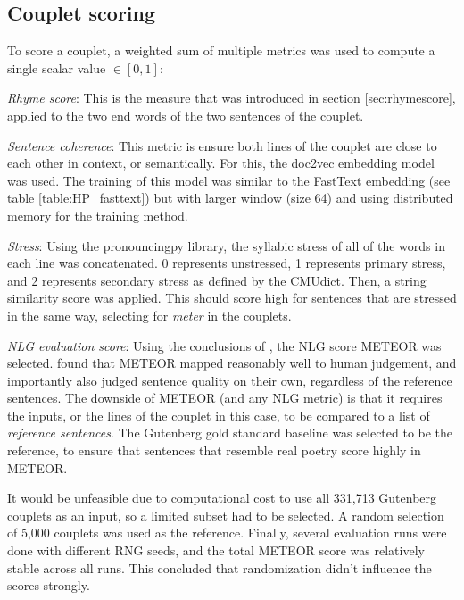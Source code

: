 \documentclass[11pt,a4paper]{article}
\newenvironment{tight_itemize}{
\begin{itemize}
\setlength{\itemsep}{0pt}
\setlength{\parskip}{0pt}
}{\end{itemize}}
\begin{document}
\subsection{Couplet scoring}
\label{sec:coupletscore}
To score a couplet, a weighted sum of multiple metrics was used to compute a single scalar value $\in [0, 1]$:
\begin{tight_itemize}
	\vspace{-0.5em}
	\item \textit{Rhyme score}: This is the measure that was introduced in section \ref{sec:rhymescore}, applied to the two end words of the two sentences of the couplet.
	\item \textit{Sentence coherence}: This metric is ensure both lines of the couplet are close to each other in context, or semantically. For this, the doc2vec embedding model \cite{docvec} was used. The training of this model was similar to the FastText embedding (see table \ref{table:HP_fasttext}) but with larger window (size 64) and using distributed memory for the training method.
	\item \textit{Stress}: Using the pronouncingpy library, the syllabic stress of all of the words in each line was concatenated. 0 represents unstressed, 1 represents primary stress, and 2 represents secondary stress as defined by the CMUdict. Then, a string similarity score \cite{ratcliff} was applied. This should score high for sentences that are stressed in the same way, selecting for \textit{meter} in the couplets.
	\item \textit{NLG evaluation score}: Using the conclusions of \citet{nlgeval}, the NLG score METEOR \cite{meteor} was selected. \citet{nlgeval} found that METEOR mapped reasonably well to human judgement, and importantly also judged sentence quality on their own, regardless of the reference sentences. The downside of METEOR (and any NLG metric) is that it requires the inputs, or the lines of the couplet in this case, to be compared to a list of \textit{reference sentences}. The Gutenberg gold standard baseline was selected to be the reference, to ensure that sentences that resemble real poetry score highly in METEOR.

		It would be unfeasible due to computational cost to use all 331,713 Gutenberg couplets as an input, so a limited subset had to be selected. A random selection of 5,000 couplets was used as the reference. Finally, several evaluation runs were done with different RNG seeds, and the total METEOR score was relatively stable across all runs. This concluded that randomization didn't influence the scores strongly.
\end{tight_itemize}
\end{document}
